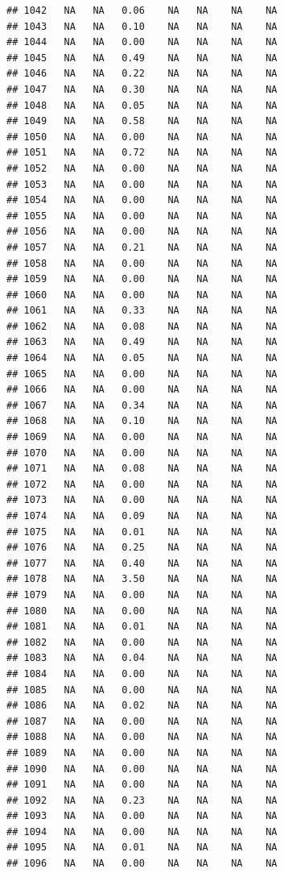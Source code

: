 \documentclass{article}\usepackage{graphicx, color}
\makeatletter
\newenvironment{kframe}{%
 \def\at@end@of@kframe{}%
 \ifinner\ifhmode%
  \def\at@end@of@kframe{\end{minipage}}%
  \begin{minipage}{\columnwidth}%
 \fi\fi%
 \def\FrameCommand##1{\hskip\@totalleftmargin \hskip-\fboxsep
 \colorbox{shadecolor}{##1}\hskip-\fboxsep
     \hskip-\linewidth \hskip-\@totalleftmargin \hskip\columnwidth}%
 \MakeFramed {\advance\hsize-\width
   \@totalleftmargin\z@ \linewidth\hsize
   \@setminipage}}%
 {\par\unskip\endMakeFramed%
 \at@end@of@kframe}
\newenvironment{knitrout}{}{} %
\makeatother
\begin{document}
\begin{knitrout}
\begin{kframe}
\begin{verbatim}
## 1042   NA   NA   0.06    NA   NA    NA    NA
## 1043   NA   NA   0.10    NA   NA    NA    NA
## 1044   NA   NA   0.00    NA   NA    NA    NA
## 1045   NA   NA   0.49    NA   NA    NA    NA
## 1046   NA   NA   0.22    NA   NA    NA    NA
## 1047   NA   NA   0.30    NA   NA    NA    NA
## 1048   NA   NA   0.05    NA   NA    NA    NA
## 1049   NA   NA   0.58    NA   NA    NA    NA
## 1050   NA   NA   0.00    NA   NA    NA    NA
## 1051   NA   NA   0.72    NA   NA    NA    NA
## 1052   NA   NA   0.00    NA   NA    NA    NA
## 1053   NA   NA   0.00    NA   NA    NA    NA
## 1054   NA   NA   0.00    NA   NA    NA    NA
## 1055   NA   NA   0.00    NA   NA    NA    NA
## 1056   NA   NA   0.00    NA   NA    NA    NA
## 1057   NA   NA   0.21    NA   NA    NA    NA
## 1058   NA   NA   0.00    NA   NA    NA    NA
## 1059   NA   NA   0.00    NA   NA    NA    NA
## 1060   NA   NA   0.00    NA   NA    NA    NA
## 1061   NA   NA   0.33    NA   NA    NA    NA
## 1062   NA   NA   0.08    NA   NA    NA    NA
## 1063   NA   NA   0.49    NA   NA    NA    NA
## 1064   NA   NA   0.05    NA   NA    NA    NA
## 1065   NA   NA   0.00    NA   NA    NA    NA
## 1066   NA   NA   0.00    NA   NA    NA    NA
## 1067   NA   NA   0.34    NA   NA    NA    NA
## 1068   NA   NA   0.10    NA   NA    NA    NA
## 1069   NA   NA   0.00    NA   NA    NA    NA
## 1070   NA   NA   0.00    NA   NA    NA    NA
## 1071   NA   NA   0.08    NA   NA    NA    NA
## 1072   NA   NA   0.00    NA   NA    NA    NA
## 1073   NA   NA   0.00    NA   NA    NA    NA
## 1074   NA   NA   0.09    NA   NA    NA    NA
## 1075   NA   NA   0.01    NA   NA    NA    NA
## 1076   NA   NA   0.25    NA   NA    NA    NA
## 1077   NA   NA   0.40    NA   NA    NA    NA
## 1078   NA   NA   3.50    NA   NA    NA    NA
## 1079   NA   NA   0.00    NA   NA    NA    NA
## 1080   NA   NA   0.00    NA   NA    NA    NA
## 1081   NA   NA   0.01    NA   NA    NA    NA
## 1082   NA   NA   0.00    NA   NA    NA    NA
## 1083   NA   NA   0.04    NA   NA    NA    NA
## 1084   NA   NA   0.00    NA   NA    NA    NA
## 1085   NA   NA   0.00    NA   NA    NA    NA
## 1086   NA   NA   0.02    NA   NA    NA    NA
## 1087   NA   NA   0.00    NA   NA    NA    NA
## 1088   NA   NA   0.00    NA   NA    NA    NA
## 1089   NA   NA   0.00    NA   NA    NA    NA
## 1090   NA   NA   0.00    NA   NA    NA    NA
## 1091   NA   NA   0.00    NA   NA    NA    NA
## 1092   NA   NA   0.23    NA   NA    NA    NA
## 1093   NA   NA   0.00    NA   NA    NA    NA
## 1094   NA   NA   0.00    NA   NA    NA    NA
## 1095   NA   NA   0.01    NA   NA    NA    NA
## 1096   NA   NA   0.00    NA   NA    NA    NA

\end{verbatim}
\end{kframe}
\end{knitrout}
\end{document}
